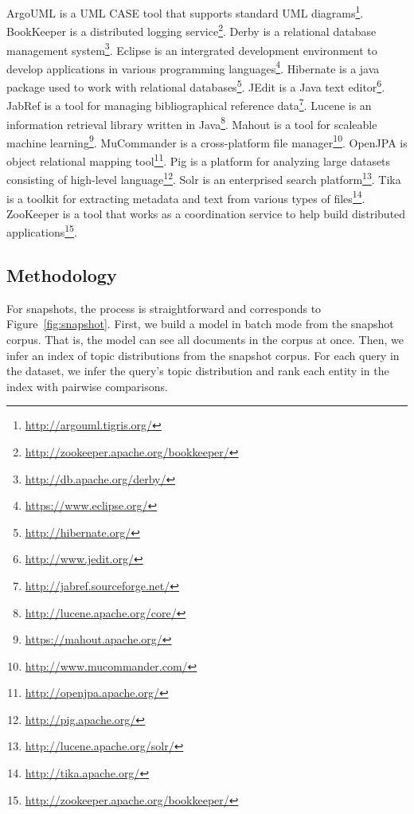 ArgoUML is a UML CASE tool that supports standard UML diagrams\footnote{\url{http://argouml.tigris.org/}}.
BookKeeper is a distributed logging service\footnote{\url{http://zookeeper.apache.org/bookkeeper/}}.
Derby is a relational database management system\footnote{\url{http://db.apache.org/derby/}}.
Eclipse is an intergrated development environment to develop applications in various programming languages\footnote{\url{https://www.eclipse.org/}}.
Hibernate is a java package used to work with relational databases\footnote{\url{http://hibernate.org/}}.
JEdit is a Java text editor\footnote{\url{http://www.jedit.org/}}.
JabRef is a tool for managing bibliographical reference data\footnote{\url{http://jabref.sourceforge.net/}}.
Lucene is an information retrieval library written in Java\footnote{\url{http://lucene.apache.org/core/}}.
Mahout is a tool for scaleable machine learning\footnote{\url{https://mahout.apache.org/}}.
MuCommander is a cross-platform file manager\footnote{\url{http://www.mucommander.com/}}.
OpenJPA is object relational mapping tool\footnote{\url{http://openjpa.apache.org/}}.
Pig is a platform for analyzing large datasets consisting of high-level language\footnote{\url{http://pig.apache.org/}}.
Solr is an enterprised search platform\footnote{\url{http://lucene.apache.org/solr/}}.
Tika is a toolkit for extracting metadata and text from various types of files\footnote{\url{http://tika.apache.org/}}.
ZooKeeper is a tool that works as a coordination service to help build distributed applications\footnote{\url{http://zookeeper.apache.org/bookkeeper/}}.



\subsection{Methodology}
\label{sec:methodology}

For snapshots, the process is straightforward and corresponds to
Figure~\ref{fig:snapshot}.  First, we build a model in batch mode from the
snapshot corpus.  That is, the model can see all documents in the corpus at
once.  Then, we infer an index of topic distributions from the snapshot corpus.
For each query in the dataset, we infer the query's topic distribution and rank
each entity in the index with pairwise comparisons.

